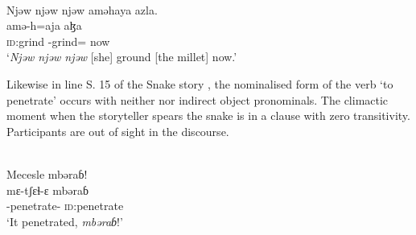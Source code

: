 \ea \label{ex:9:67}
\\
Njəw  njəw  njəw  aməhaya  azla.\\
    amə-h=aja        aɮa\\
      \textsc{id}:grind  {\DEP}-grind={\PLU} now\\
\glt  ‘\textit{Njəw  njəw  njəw} [she] ground [the millet] now.’  
\z

Likewise in line S. 15 of the Snake story , the nominalised form of the verb ‘to penetrate’ occurs with neither \DO nor indirect object pronominals. The climactic moment when the storyteller spears the snake is in a clause with zero transitivity. Participants are out of sight in the discourse. 

\ea \label{ex:9:68}
\\
Mecesle  mbəraɓ!\\
\gll  mɛ-tʃɛɬ-ɛ  mbəraɓ\\
      {\NOM}{}-penetrate{}-{\CL}      \textsc{id}:penetrate \\
\glt  ‘It penetrated, \textit{mbəraɓ}!’
\z
{}
